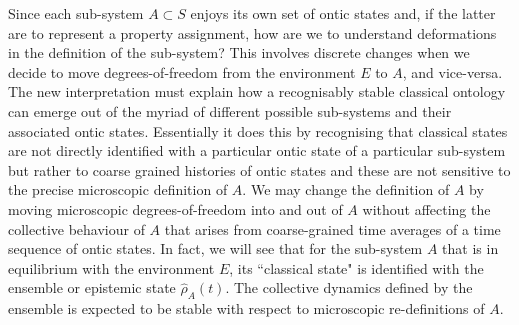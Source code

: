 \documentclass[%
preprint,
nofootinbib,
 amsmath,amssymb,
aps,
]{revtex4-1}
\def\BS{S}
\def\BA{A}
\begin{document}
Since each sub-system $\BA\subset\BS$ enjoys its own set of ontic states and, if the latter are to represent a property assignment, how are we to understand deformations in the definition of the sub-system? This involves discrete changes when we decide to move degrees-of-freedom from the environment $E$ to $\BA$, and vice-versa. The new interpretation  must explain how a recognisably stable classical ontology can emerge out of the myriad of different possible sub-systems and their associated ontic states. 
Essentially it does this by recognising that classical states are not 
directly identified with a particular ontic state of a particular sub-system but rather to coarse grained histories of ontic states and these are not sensitive to the precise microscopic definition of $\BA$. We may change the definition of $A$ by moving microscopic degrees-of-freedom into and out of $A$ without affecting the collective behaviour of $A$ that arises from coarse-grained time averages of a time sequence of ontic states. In fact, we will see that for the sub-system $A$ that is in equilibrium with the environment $E$, its ``classical state" is identified with the ensemble or epistemic state $\hat\rho_A(t)$. The collective dynamics defined by the ensemble is expected to be stable with respect to microscopic re-definitions of $A$.
\end{document}
